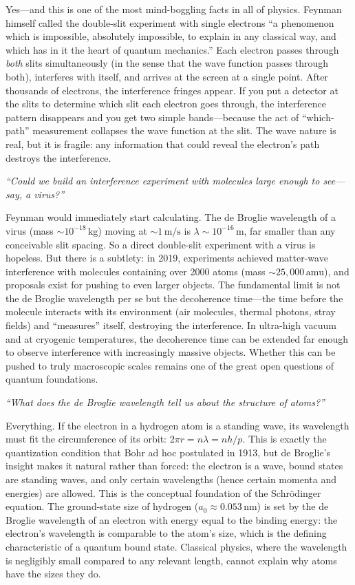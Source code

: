 Yes---and this is one of the most mind-boggling facts in all of physics. Feynman himself called the double-slit experiment with single electrons ``a phenomenon which is impossible, absolutely impossible, to explain in any classical way, and which has in it the heart of quantum mechanics.'' Each electron passes through \emph{both} slits simultaneously (in the sense that the wave function passes through both), interferes with itself, and arrives at the screen at a single point. After thousands of electrons, the interference fringes appear. If you put a detector at the slits to determine which slit each electron goes through, the interference pattern disappears and you get two simple bands---because the act of ``which-path'' measurement collapses the wave function at the slit. The wave nature is real, but it is fragile: any information that could reveal the electron's path destroys the interference.

\textit{``Could we build an interference experiment with molecules large enough to see---say, a virus?''}

Feynman would immediately start calculating. The de Broglie wavelength of a virus (mass $\sim 10^{-18}\,\text{kg}$) moving at $\sim 1\,\text{m/s}$ is $\lambda \sim 10^{-16}\,\text{m}$, far smaller than any conceivable slit spacing. So a direct double-slit experiment with a virus is hopeless. But there is a subtlety: in 2019, experiments achieved matter-wave interference with molecules containing over 2000 atoms (mass $\sim 25{,}000\,\text{amu}$), and proposals exist for pushing to even larger objects. The fundamental limit is not the de Broglie wavelength per se but the decoherence time---the time before the molecule interacts with its environment (air molecules, thermal photons, stray fields) and ``measures'' itself, destroying the interference. In ultra-high vacuum and at cryogenic temperatures, the decoherence time can be extended far enough to observe interference with increasingly massive objects. Whether this can be pushed to truly macroscopic scales remains one of the great open questions of quantum foundations.

\textit{``What does the de Broglie wavelength tell us about the structure of atoms?''}

Everything. If the electron in a hydrogen atom is a standing wave, its wavelength must fit the circumference of its orbit: $2\pi r = n\lambda = nh/p$. This is exactly the quantization condition that Bohr ad hoc postulated in 1913, but de Broglie's insight makes it natural rather than forced: the electron is a wave, bound states are standing waves, and only certain wavelengths (hence certain momenta and energies) are allowed. This is the conceptual foundation of the Schrödinger equation. The ground-state size of hydrogen ($a_0 \approx 0.053\,\text{nm}$) is set by the de Broglie wavelength of an electron with energy equal to the binding energy: the electron's wavelength is comparable to the atom's size, which is the defining characteristic of a quantum bound state. Classical physics, where the wavelength is negligibly small compared to any relevant length, cannot explain why atoms have the sizes they do.

